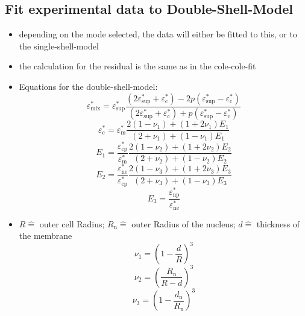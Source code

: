 \documentclass[10pt,a4paper]{article}
\renewcommand{\*}{\cdot}
\begin{document}
\subsection{Fit experimental data to Double-Shell-Model}
\begin{itemize}
\item depending on the mode selected, the data will either be fitted to this, or to the single-shell-model
\item the calculation for the residual is the same as in the cole-cole-fit
\item Equations for the double-shell-model: 
\begin{equation}
\varepsilon_\mathrm{mix}^\ast = \varepsilon_\mathrm{sup}^\ast\frac{(2\varepsilon_\mathrm{sup}^\ast+\varepsilon_\mathrm{c}^\ast)-2p(\varepsilon_\mathrm{sup}^\ast-\varepsilon_\mathrm{c}^\ast)}{(2\varepsilon_\mathrm{sup}^\ast+\varepsilon_\mathrm{c}^\ast)+p(\varepsilon_\mathrm{sup}^\ast-\varepsilon_\mathrm{c}^\ast)}
\end{equation}
\begin{equation}
\varepsilon_\mathrm{c}^\ast = \varepsilon_\mathrm{m}^\ast\frac{2(1-\nu_\mathrm{1})+(1+2\nu_\mathrm{1})E_\mathrm{1}}{(2+\nu_\mathrm{1})+(1-\nu_\mathrm{1})E_\mathrm{1}}
\end{equation}
\begin{equation}
E_\mathrm{1}  = \frac{\varepsilon_\mathrm{cp}^\ast}{\varepsilon_\mathrm{m}^\ast} \frac{2(1-\nu_\mathrm{2})+(1+2\nu_\mathrm{2})E_\mathrm{2}}{(2+\nu_\mathrm{2})+(1-\nu_\mathrm{2})E_\mathrm{2}}
\end{equation}
\begin{equation}
E_\mathrm{2} = \frac{\varepsilon_\mathrm{ne}^\ast}{\varepsilon_\mathrm{cp}^\ast}\frac{2(1-\nu_\mathrm{3})+(1+2\nu_\mathrm{3})E_\mathrm{3}}{(2+\nu_\mathrm{3})+(1-\nu_\mathrm{3})E_\mathrm{3}}
\end{equation}
\begin{equation}
E_\mathrm{3} = \frac{\varepsilon_\mathrm{np}^\ast}{\varepsilon_\mathrm{ne}^\ast}
\end{equation}
\item $R \hat{=}$ outer cell Radius; $R_\mathrm{n} \hat{=}$ outer Radius of the nucleus; $d \hat{=}$ thickness of the membrane
\begin{equation}
\nu_\mathrm{1} = \left(1-\frac{d}{R}\right)^3
\end{equation}
\begin{equation}
\nu_\mathrm{2} = \left(\frac{R_\mathrm{n}}{R-d}\right)^3
\end{equation}
\begin{equation}
\nu_\mathrm{3} = \left(1-\frac{d_\mathrm{n}}{R_\mathrm{n}}\right)^3
\end{equation}


\end{itemize}
\end{document}
